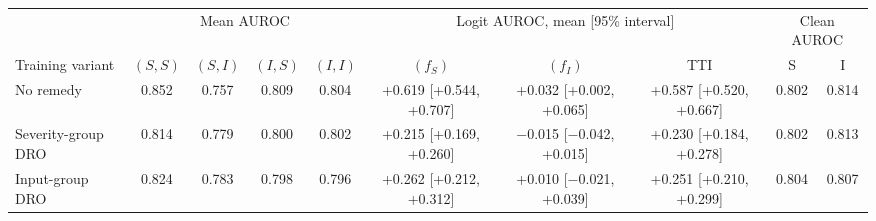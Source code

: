\begin{tabular}{@{}lccccccccc@{}}
\toprule
 & \multicolumn{4}{c}{Mean AUROC} & \multicolumn{3}{c}{Logit AUROC, mean [95\% interval]} & \multicolumn{2}{c}{Clean AUROC} \\
\cmidrule(lr){2-5}\cmidrule(lr){6-8}\cmidrule(lr){9-10}
Training variant & $(S,S)$ & $(S,I)$ & $(I,S)$ & $(I,I)$ & \R{}$(f_S)$ & \R{}$(f_I)$ & TTI & S & I \\
\midrule
No remedy & 0.852 & 0.757 & 0.809 & 0.804 & +0.619 [+0.544, +0.707] & +0.032 [+0.002, +0.065] & +0.587 [+0.520, +0.667] & 0.802 & 0.814 \\
Severity-group DRO & 0.814 & 0.779 & 0.800 & 0.802 & +0.215 [+0.169, +0.260] & $-$0.015 [$-$0.042, +0.015] & +0.230 [+0.184, +0.278] & 0.802 & 0.813 \\
Input-group DRO & 0.824 & 0.783 & 0.798 & 0.796 & +0.262 [+0.212, +0.312] & +0.010 [$-$0.021, +0.039] & +0.251 [+0.210, +0.299] & 0.804 & 0.807 \\
\bottomrule
\end{tabular}
